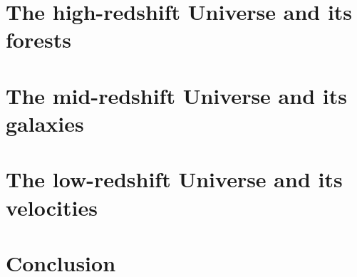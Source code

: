 \documentclass[english]{amu_these}
\begin{document}
	\chapter{ The high-redshift Universe and its forests }
	\label{chap:forests}
	

	\chapter{ The mid-redshift Universe and its galaxies }
	\label{chap:galaxies}
	

	\chapter{ The low-redshift Universe and its velocities }
	\label{chap:velocities}
	

	\chapter*{Conclusion}
	

	\appendix

	\newpage
	\printbibliography[					%
	heading=bibintoc
	]	

	
	
\end{document}
